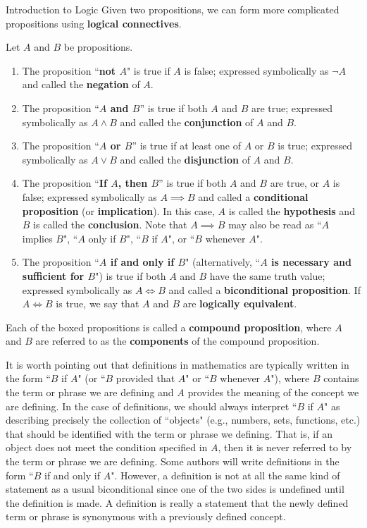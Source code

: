 \begin{section}{Introduction to Logic}
Given two propositions, we can form more complicated propositions using \textbf{logical connectives}.

\begin{definition}\label{def:logical connectives}
Let $A$ and $B$ be propositions.  
\begin{enumerate}[label=\textrm{(\alph*)}]
\item The proposition ``\textbf{not $A$}" is true if $A$ is false; expressed symbolically as $\boxed{\neg A}$ and called the \textbf{negation} of $A$.
\item The proposition ``\textbf{$A$ and $B$}'' is true if both $A$ and $B$ are true; expressed symbolically as $\boxed{A \wedge B}$ and called the \textbf{conjunction} of $A$ and $B$.
\item The proposition ``\textbf{$A$ or $B$}'' is true if at least one of $A$ or $B$ is true; expressed symbolically as $\boxed{A \vee B}$ and called the \textbf{disjunction} of $A$ and $B$.
\item\label{def:conditional} The proposition ``\textbf{If $A$, then $B$}'' is true if both $A$ and $B$ are true, or $A$ is false; expressed symbolically as $\boxed{A \implies B}$ and called a \textbf{conditional proposition} (or \textbf{implication}). In this case, $A$ is called the \textbf{hypothesis} and $B$ is called the \textbf{conclusion}. Note that $A \implies B$ may also be read as ``$A$ implies $B$", ``$A$ only if $B$", ``$B$ if $A$", or ``$B$ whenever $A$". 
\item\label{def:logically equivalent} The proposition ``\textbf{$A$ if and only if $B$}" (alternatively, ``\textbf{$A$ is necessary and sufficient for $B$}") is true if both $A$ and $B$ have the same truth value; expressed symbolically as $\boxed{A\iff B}$ and called a \textbf{biconditional proposition}. If $A\iff B$ is true, we say that $A$ and $B$ are \textbf{logically equivalent}.
\end{enumerate}
Each of the boxed propositions is called a \textbf{compound proposition}, where $A$ and $B$ are referred to as the \textbf{components} of the compound proposition.
\end{definition}

It is worth pointing out that definitions in mathematics are typically written in the form ``$B$ if $A$" (or ``$B$ provided that $A$" or ``$B$ whenever $A$"), where $B$ contains the term or phrase we are defining and $A$ provides the meaning of the concept we are defining. In the case of definitions, we should always interpret ``$B$ if $A$" as describing precisely the collection of ``objects" (e.g., numbers, sets, functions, etc.) that should be identified with the term or phrase we defining.  That is, if an object does not meet the condition specified in $A$, then it is never referred to by the term or phrase we are defining. Some authors will write definitions in the form ``$B$ if and only if $A$". However, a definition is not at all the same kind of statement as a usual biconditional since one of the two sides is undefined until the definition is made. A definition is really a statement that the newly defined term or phrase is synonymous with a previously defined concept.


\end{section}
